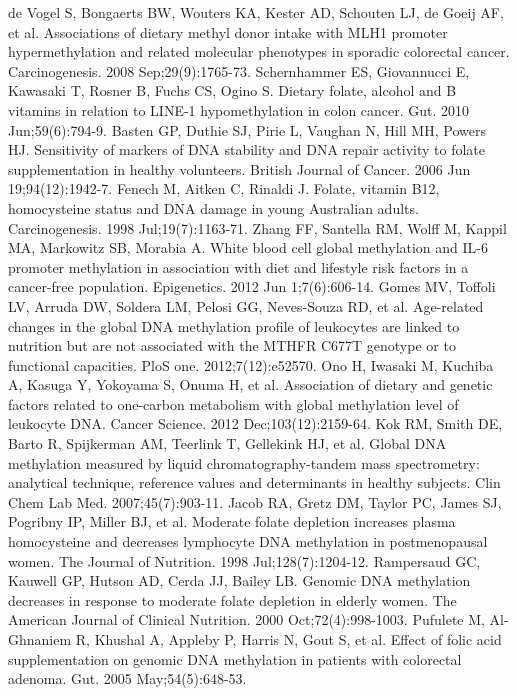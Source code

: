 \begin{thebibliography}{12}
		de Vogel S, Bongaerts BW, Wouters KA, Kester AD, Schouten LJ, de Goeij AF, et al. Associations of dietary methyl donor intake with MLH1 promoter hypermethylation and related molecular phenotypes in sporadic colorectal cancer. Carcinogenesis. 2008 Sep;29(9):1765-73. 
		Schernhammer ES, Giovannucci E, Kawasaki T, Rosner B, Fuchs CS, Ogino S. Dietary folate, alcohol and B vitamins in relation to LINE-1 hypomethylation in colon cancer. Gut. 2010 Jun;59(6):794-9. 
		Basten GP, Duthie SJ, Pirie L, Vaughan N, Hill MH, Powers HJ. Sensitivity of markers of DNA stability and DNA repair activity to folate supplementation in healthy volunteers. British Journal of Cancer. 2006 Jun 19;94(12):1942-7. 
		Fenech M, Aitken C, Rinaldi J. Folate, vitamin B12, homocysteine status and DNA damage in young Australian adults. Carcinogenesis. 1998 Jul;19(7):1163-71. 
		Zhang FF, Santella RM, Wolff M, Kappil MA, Markowitz SB, Morabia A. White blood cell global methylation and IL-6 promoter methylation in association with diet and lifestyle risk factors in a cancer-free population. Epigenetics. 2012 Jun 1;7(6):606-14. 
		Gomes MV, Toffoli LV, Arruda DW, Soldera LM, Pelosi GG, Neves-Souza RD, et al. Age-related changes in the global DNA methylation profile of leukocytes are linked to nutrition but are not associated with the MTHFR C677T genotype or to functional capacities. PloS one. 2012;7(12):e52570. 
		Ono H, Iwasaki M, Kuchiba A, Kasuga Y, Yokoyama S, Onuma H, et al. Association of dietary and genetic factors related to one-carbon metabolism with global methylation level of leukocyte DNA. Cancer Science. 2012 Dec;103(12):2159-64. 
		Kok RM, Smith DE, Barto R, Spijkerman AM, Teerlink T, Gellekink HJ, et al. Global DNA methylation measured by liquid chromatography-tandem mass spectrometry: analytical technique, reference values and determinants in healthy subjects. Clin Chem Lab Med. 2007;45(7):903-11. 
		Jacob RA, Gretz DM, Taylor PC, James SJ, Pogribny IP, Miller BJ, et al. Moderate folate depletion increases plasma homocysteine and decreases lymphocyte DNA methylation in postmenopausal women. The Journal of Nutrition. 1998 Jul;128(7):1204-12. 
		Rampersaud GC, Kauwell GP, Hutson AD, Cerda JJ, Bailey LB. Genomic DNA methylation decreases in response to moderate folate depletion in elderly women. The American Journal of Clinical Nutrition. 2000 Oct;72(4):998-1003. 
		Pufulete M, Al-Ghnaniem R, Khushal A, Appleby P, Harris N, Gout S, et al. Effect of folic acid supplementation on genomic DNA methylation in patients with colorectal adenoma. Gut. 2005 May;54(5):648-53. 

\end{thebibliography}
